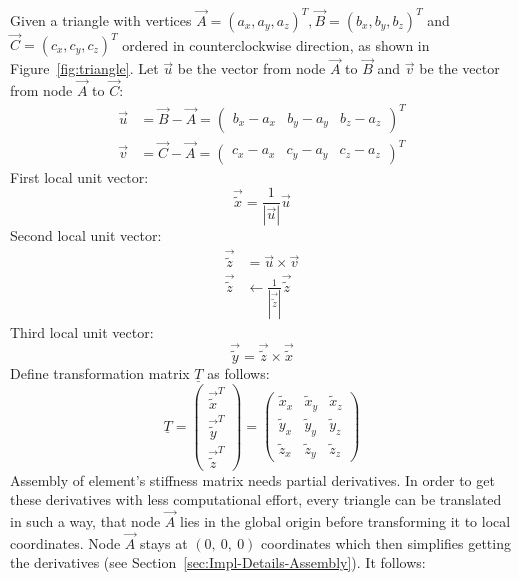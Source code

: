   Given a triangle with vertices $\vec{A} = (a_x, a_y, a_z)^T, \vec{B} = (b_x, b_y, b_z)^T$ and $\vec{C} = (c_x, c_y, c_z)^T$ ordered in counterclockwise direction, as shown in Figure~\ref{fig:triangle}. Let $\vec{u}$ be the vector from node $\vec{A}$ to $\vec{B}$ and $\vec{v}$ be the vector from node $\vec{A}$ to $\vec{C}$:
  \begin{align*}
  \vec{u} &= \vec{B}-\vec{A} = \begin{pmatrix}
  b_x - a_x & b_y - a_y & b_z - a_z
  \end{pmatrix}^T\\
  \vec{v} &= \vec{C}-\vec{A} = \begin{pmatrix}
  c_x - a_x & c_y - a_y & c_z - a_z
  \end{pmatrix}^T
  \end{align*}
  First local unit vector:
  \begin{equation*}
   \vec{\tilde{x}} = \frac{1}{\left|\vec{u}\right|}\vec{u}
  \end{equation*}
  Second local unit vector:
  \begin{align*}
   \vec{\tilde{z}} &= \vec{u} \times \vec{v} \\
   \vec{\tilde{z}} &\leftarrow \frac{1}{\left|\vec{\tilde{z}}\right|}\vec{\tilde{z}}
  \end{align*}
  Third local unit vector:
  \begin{equation*}
   \vec{\tilde{y}} = \vec{\tilde{z}} \times \vec{\tilde{x}}
  \end{equation*}
  Define transformation matrix $\underline{T}$ as follows:
  \begin{equation}\label{eq:trafoT_tri}
   \underline{T} = \begin{pmatrix}
   \vec{\tilde{x}}^T\\ \vec{\tilde{y}}^T\\ \vec{\tilde{z}}^T
   \end{pmatrix} = \begin{pmatrix}
   \tilde{x}_x & \tilde{x}_y & \tilde{x}_z\\
   \tilde{y}_x & \tilde{y}_y & \tilde{y}_z\\
   \tilde{z}_x & \tilde{z}_y & \tilde{z}_z
   \end{pmatrix}
  \end{equation}
  Assembly of element's stiffness matrix needs partial derivatives. In order to get these derivatives with less computational effort, every triangle can be translated in such a way, that node $\vec{A}$ lies in the global origin before transforming it to local coordinates. Node $\vec{A}$ stays at $(0,\ 0,\ 0)$ coordinates which then simplifies getting the derivatives (see Section~\ref{sec:Impl-Details-Assembly}). It follows:
